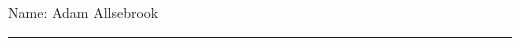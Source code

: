 \documentclass[11pt,oneside]{book}
\begin{document}
\noindent Name: Adam Allsebrook\\[1mm]
\rule[1em]{25em}{0.5pt}




\tableofcontents
\listoffigures
\listoftables


\mainmatter









\printbibliography
\end{document}

